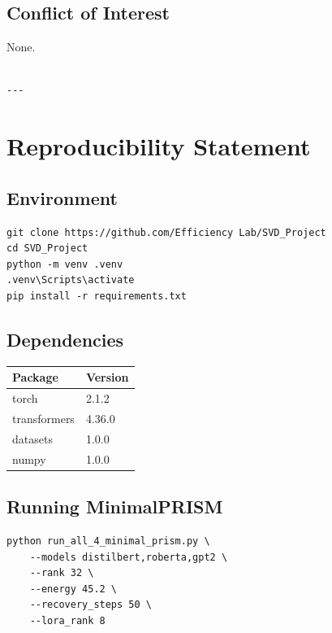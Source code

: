 \subsection{Conflict of Interest}

None.
\begin{lstlisting}

---
\end{lstlisting}


\section{Reproducibility Statement}

\subsection{Environment}

\begin{lstlisting}
git clone https://github.com/Efficiency Lab/SVD_Project
cd SVD_Project
python -m venv .venv
.venv\Scripts\activate
pip install -r requirements.txt
\end{lstlisting}

\subsection{Dependencies}

\begin{table}[H]
\centering
\small
\begin{tabular}{ll}
\toprule
\textbf{Package} & \textbf{Version} \\
\midrule
torch & 2.1.2 \\
transformers & 4.36.0 \\
datasets & 1.0.0 \\
numpy & 1.0.0 \\
\bottomrule
\end{tabular}
\end{table}

\subsection{Running MinimalPRISM}

\begin{lstlisting}
python run_all_4_minimal_prism.py \
    --models distilbert,roberta,gpt2 \
    --rank 32 \
    --energy 45.2 \
    --recovery_steps 50 \
    --lora_rank 8
\end{lstlisting}

